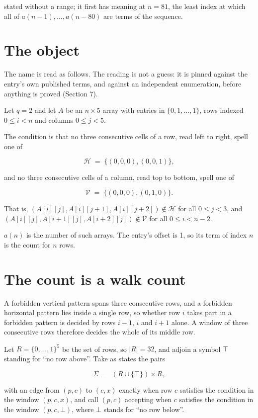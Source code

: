 \documentclass[11pt]{article}
\theoremstyle{definition}
\begin{document}
stated without a range; it first has meaning at $n = 81$, the least index at which all of $a(n-1),\dots,a(n-80)$ are terms of the sequence.

\section{The object}

The name is read as follows. The reading is not a guess: it is pinned against the entry's own published terms, and against an independent enumeration, before anything is proved (Section 7).

Let $q = 2$ and let $A$ be an $n \times 5$ array with entries in $\{0,1,\dots,1\}$, rows indexed $0 \le i < n$ and columns $0 \le j < 5$.

The condition is that no three consecutive cells of a row, read left to right, spell one of

\[\mathcal{H} \;=\; \{(0,0,0), (0,0,1)\},\]

and no three consecutive cells of a column, read top to bottom, spell one of

\[\mathcal{V} \;=\; \{(0,0,0), (0,1,0)\}.\]

That is, $(A[i][j],A[i][j{+}1],A[i][j{+}2]) \notin \mathcal{H}$ for all $0 \le j < 3$, and $(A[i][j],A[i{+}1][j],A[i{+}2][j]) \notin \mathcal{V}$ for all $0 \le i < n-2$.

$a(n)$ is the number of such arrays. The entry's offset is 1, so its term of index $n$ is the count for $n$ rows.

\section{The count is a walk count}

A forbidden vertical pattern spans three consecutive rows, and a forbidden horizontal pattern lies inside a single row, so whether row $i$ takes part in a forbidden pattern is decided by rows $i-1$, $i$ and $i+1$ alone. A window of three consecutive rows therefore decides the whole of its middle row.

Let $R = \{0,\dots,1\}^{5}$ be the set of rows, so $|R| = 32$, and adjoin a symbol $\top$ standing for ``no row above''. Take as states the pairs

\[\Sigma \;=\; (R \cup \{\top\}) \times R,\]

with an edge from $(p,c)$ to $(c,x)$ exactly when row $c$ satisfies the condition in the window $(p,c,x)$, and call $(p,c)$ accepting when $c$ satisfies the condition in the window $(p,c,\bot)$, where $\bot$ stands for ``no row below''.
\end{document}
